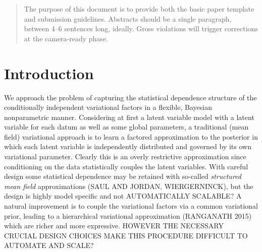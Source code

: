 \documentclass{article}
\begin{document}

\begin{abstract}
The purpose of this document is to provide both the basic paper template and
submission guidelines. Abstracts should be a single paragraph, between 4--6 sentences long, ideally.  Gross violations will trigger corrections at the camera-ready phase.
\end{abstract}

\section{Introduction}
\label{sec:intro}

We approach the problem of capturing the statistical dependence structure of the conditionally independent variational factors in a flexible, Bayesian nonparametric manner. Considering at first a latent variable model with a latent variable for each datum as well as some global parameters, a traditional (mean field) variational approach is to learn a factored approximation to the posterior in which each latent variable is independently distributed and governed by its own variational parameter. Clearly this is an overly restrictive approximation since conditioning on the data statistically couples the latent variables. With careful design some statistical dependence may be retained with so-called \emph{structured mean field} approximations (SAUL AND JORDAN, WIERGERNINCK), but the design is highly model specific and not AUTOMATICALLY SCALABLE?
A natural improvement is to couple the variational factors via a common variational prior, leading to a hierarchical variational approximation (RANGANATH 2015) which are richer and more expressive. HOWEVER THE NECESSARY CRUCIAL DESIGN CHOICES MAKE THIS PROCEDURE DIFFICULT TO AUTOMATE AND SCALE?
\end{document}
